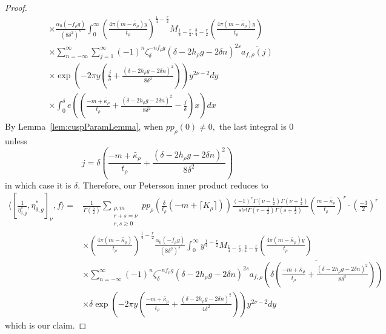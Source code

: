 \documentclass[10pt]{amsart}
\theoremstyle{definition}
\theoremstyle{remark}
\numberwithin{equation}{section}
\begin{document}
\begin{proof}
\begin{align*}
			&\times \frac{\alpha_0(-f_\rho g)}{(8\delta^2)^s}\int_0^\infty\left(\frac{4\pi(m-\widetilde{\kappa_\rho})y}{t_\rho}\right)^{\frac{1}{4}-\frac{r}{2}} M_{\frac{1}{4}-\frac{r}{2},\frac{3}{4}-\frac{r}{2}}\left(\frac{4\pi(m-\widetilde{\kappa_\rho})y}{t_\rho}\right) \\
			&\times \sum\limits_{n=-\infty}^\infty\sum\limits_{j = 1}^\infty (-1)^n\zeta_{\delta}^{-nf_\rho g}(\delta-2h_\rho g-2\delta n)^{2s}\overline{a_{f,\rho}(j)} \\
			&\times\exp\left(-2\pi y\left(\frac{j}{\delta}+\frac{(\delta-2h_\rho g-2\delta n)^2}{8\delta^2}\right)\right)y^{2\nu-2}dy \\
			&\times\int_0^\delta e\left(\left(\frac{-m+\widetilde{\kappa_\rho}}{t_\rho}+\frac{(\delta-2h_\rho g-2\delta n)^2}{8\delta^2} -\frac{j}{\delta}\right)x\right)dx
		\end{align*}
		By Lemma~\ref{lem:cuspParamLemma}, when $pp_\rho(0)\neq0,$  the last integral is $0$ unless
		$$
		j=\delta\left(\frac{-m+\widetilde{\kappa_\rho}}{t_\rho}+\frac{(\delta-2h_\rho g-2\delta n)^2}{8\delta^2}\right)
		$$
		in which case it is $\delta.$ Therefore, our Petersson inner product reduces to
		\begin{align*}
			\langle[\frac{1}{\eta_{\delta,g}^\ast},\eta_{\delta,g}^\ast]_\nu,f\rangle =
			& \frac{1}{\Gamma\left(\frac{5}{2}\right)}\sum\limits_{\substack{\rho,m \\ r+s=\nu \\ r,s\geq 0}}pp_\rho\left(\frac{\delta}{t_\rho}(-m+\lceil K_\rho\rceil)\right) \frac{(-1)^r\Gamma(\nu-\frac{1}{2})\Gamma(\nu+\frac{1}{2})}{s!r!\Gamma(r-\frac{1}{2})\Gamma({ s}+\frac{1}{2})} \left(\frac{m-\widetilde{\kappa_\rho}}{t_\rho}\right)^r\cdot\left(\frac{-3}{2}\right)^{\overline{r}} \\
			&\times \left(\frac{4\pi(m-\widetilde{\kappa_\rho})}{t_\rho}\right)^{\frac{1}{4}-\frac{r}{2}}\frac{\alpha_0(-f_\rho g)}{(8\delta^2)^s}\int_0^\infty y^{\frac{1}{4}-\frac{r}{2}} M_{\frac{1}{4}-\frac{r}{2},\frac{3}{4}-\frac{r}{2}}\left(\frac{4\pi(m-\widetilde{\kappa_\rho})y}{t_\rho}\right) \\
			&\times\sum\limits_{n=-\infty}^\infty (-1)^n\zeta_\delta^{-nf_\rho g}(\delta-2h_\rho g-2\delta n)^{2s} \overline{a_{f,\rho}\left(\delta\left(\frac{-m+\widetilde{\kappa_\rho}}{t_\rho}+\frac{(\delta-2h_\rho g-2\delta n)^2}{8\delta^2}\right)\right)} \\
			&\times\delta\exp\left(-2\pi y\left(\frac{-m+\widetilde{\kappa_\rho}}{t_\rho}+\frac{(\delta-2h_\rho g-2\delta n)^2}{4\delta^2}\right)\right)y^{2\nu-2}dy
		\end{align*}
		which is our claim.
	\end{proof}
\end{document}
